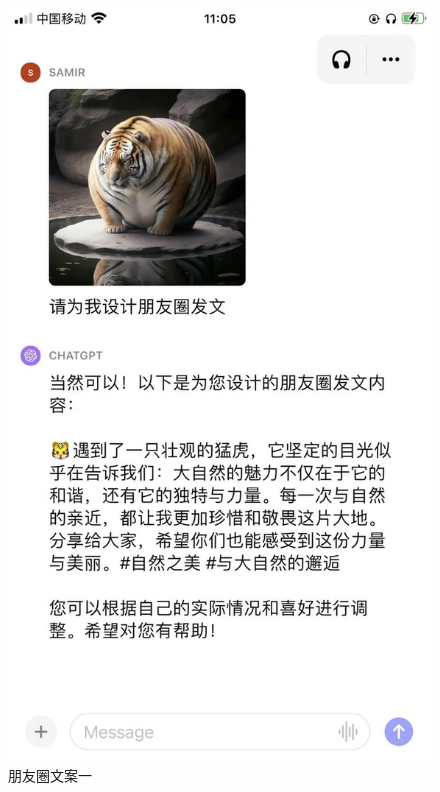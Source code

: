 \documentclass[12pt]{book}
\begin{document}
   \begin{figure}[htbp]
	\centering
	\includegraphics[width=1.0\textwidth]{image/1.png}
	\caption{朋友圈文案一}
	\label{fig:myImage}

\end{figure}
\end{document}
